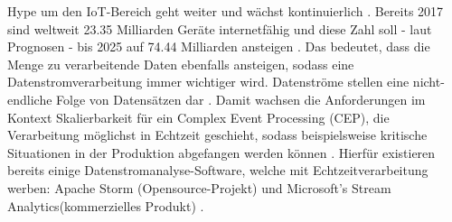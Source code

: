  Hype um den IoT-Bereich geht weiter und wächst kontinuierlich \cite{peter.2015}. Bereits 2017 sind weltweit 23.35 Milliarden Geräte internetfähig und diese Zahl soll - laut Prognosen - bis 2025 auf 74.44 Milliarden ansteigen \cite{Statista.2017}. Das bedeutet, dass die Menge zu verarbeitende Daten ebenfalls ansteigen, sodass eine Datenstromverarbeitung immer wichtiger wird. Datenströme stellen eine nicht-endliche Folge von Datensätzen dar \cite{Mock.2005}. Damit wachsen die Anforderungen im Kontext Skalierbarkeit für ein Complex Event Processing (CEP), die Verarbeitung möglichst in Echtzeit geschieht, sodass beispielsweise kritische Situationen in der Produktion abgefangen werden können \cite{rcrwireless.2016}. Hierfür existieren  bereits einige Datenstromanalyse-Software, welche mit Echtzeitverarbeitung werben: Apache Storm (Opensource-Projekt) \cite{apache.2017} und Microsoft's Stream Analytics(kommerzielles Produkt) \cite{Microsoft.2017}.

